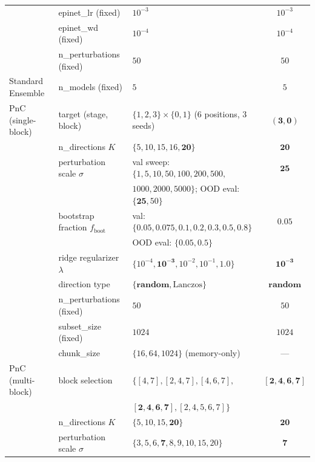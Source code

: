 \begin{table}[h]
\begin{tabular}{l l l c}
                & epinet\_lr (fixed)         & $10^{-3}$                  & $10^{-3}$ \\
                & epinet\_wd (fixed)         & $10^{-4}$                  & $10^{-4}$ \\
                & n\_perturbations (fixed)   & $50$                       & $50$ \\
\midrule
Standard Ensemble & n\_models (fixed)        & $5$                        & $5$ \\
\midrule
PnC (single-block) & target (stage, block)   & $\{1,2,3\} \times \{0,1\}$ (6 positions, 3 seeds) & $\mathbf{(3,0)}$ \\
                & n\_directions $K$          & $\{5, 10, 15, 16, \mathbf{20}\}$ & $\mathbf{20}$ \\
                & perturbation scale $\sigma$ & val sweep: $\{1, 5, 10, 50, 100, 200, 500,$ & $\mathbf{25}$ \\
                &                            & $1000, 2000, 5000\}$; OOD eval: $\{\mathbf{25}, 50\}$ & \\
                & bootstrap fraction $f_{\text{boot}}$ & val: $\{\mathbf{0.05}, 0.075, 0.1, 0.2, 0.3, 0.5, 0.8\}$ & $\mathbf{0.05}$ \\
                &                            & OOD eval: $\{0.05, 0.5\}$  &  \\
                & ridge regularizer $\lambda$ & $\{10^{-4}, \mathbf{10^{-3}}, 10^{-2}, 10^{-1}, 1.0\}$ & $\mathbf{10^{-3}}$ \\
                & direction type             & $\{\mathbf{\text{random}}, \text{Lanczos}\}$ & $\mathbf{\text{random}}$ \\
                & n\_perturbations (fixed)   & $50$                       & $50$ \\
                & subset\_size (fixed)       & $1024$                     & $1024$ \\
                & chunk\_size                & $\{16, 64, 1024\}$ (memory-only)& --- \\
\midrule
PnC (multi-block) & block selection          & $\{[4,7], [2,4,7], [4,6,7],$ & $\mathbf{[2,4,6,7]}$ \\
                  &                          & $\mathbf{[2,4,6,7]}, [2,4,5,6,7]\}$ &  \\
                & n\_directions $K$          & $\{5, 10, 15, \mathbf{20}\}$ & $\mathbf{20}$ \\
                & perturbation scale $\sigma$ & $\{3, 5, 6, \mathbf{7}, 8, 9, 10, 15, 20\}$ & $\mathbf{7}$ \\

\end{tabular}
\end{table}
